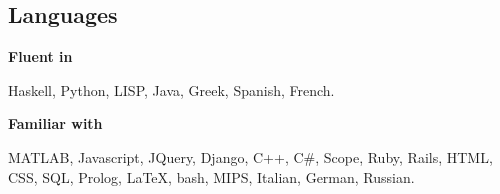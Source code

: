 \documentclass[margin,line]{resume}
\begin{document}
\begin{resume}
    \section{\mysidestyle{} Languages} 

    \textbf{Fluent in} \par\vspace{-4mm}
    {\addtolength{\leftskip}{2 mm} 
     Haskell, Python, LISP, Java, Greek, Spanish, French.
     }

    \textbf{Familiar with}\par\vspace{-4mm}
    {\addtolength{\leftskip}{2 mm} 
      MATLAB, Javascript, JQuery, Django, C++, C\#, Scope,  Ruby, Rails, HTML, CSS,  SQL, Prolog, \LaTeX, bash, MIPS, Italian, German, Russian.
    \par}


\end{resume}
\end{document}
